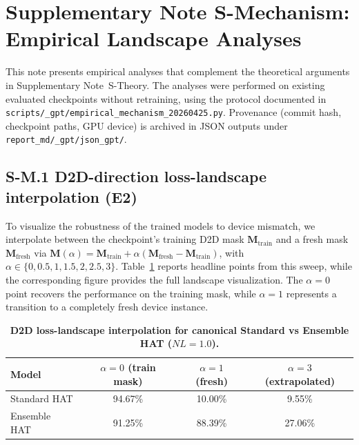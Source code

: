
\section*{Supplementary Note S-Mechanism: Empirical Landscape Analyses}
\label{supp:mechanism-empirical}

This note presents empirical analyses that complement the theoretical arguments in Supplementary Note~S-Theory. The analyses were performed on existing evaluated checkpoints without retraining, using the protocol documented in \texttt{scripts/\_gpt/empirical\_mechanism\_20260425.py}. Provenance (commit hash, checkpoint paths, GPU device) is archived in JSON outputs under \texttt{report\_md/\_gpt/json\_gpt/}.

\subsection*{S-M.1 D2D-direction loss-landscape interpolation (E2)}

To visualize the robustness of the trained models to device mismatch, we interpolate between the checkpoint's training D2D mask $\mathbf{M}_{\text{train}}$ and a fresh mask $\mathbf{M}_{\text{fresh}}$ via $\mathbf{M}(\alpha) = \mathbf{M}_{\text{train}} + \alpha(\mathbf{M}_{\text{fresh}} - \mathbf{M}_{\text{train}})$, with $\alpha \in \{0, 0.5, 1, 1.5, 2, 2.5, 3\}$. Table~\ref{tab:e2-landscape} reports headline points from this sweep, while the corresponding figure provides the full landscape visualization. The $\alpha=0$ point recovers the performance on the training mask, while $\alpha=1$ represents a transition to a completely fresh device instance.

\begin{table}[ht]
\centering
\caption{\textbf{D2D loss-landscape interpolation for canonical Standard vs Ensemble HAT ($NL=1.0$).}}
\label{tab:e2-landscape}
\begin{tabular}{lccc}
\toprule
\textbf{Model} & \textbf{$\alpha=0$ (train mask)} & \textbf{$\alpha=1$ (fresh)} & \textbf{$\alpha=3$ (extrapolated)} \\
\midrule
Standard HAT & 94.67\% & 10.00\% & 9.55\% \\
Ensemble HAT & 91.25\% & 88.39\% & 27.06\% \\
\bottomrule
\end{tabular}
\end{table}

